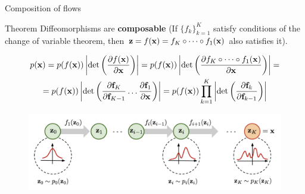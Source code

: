 \begin{frame}{Composition of flows}
	\begin{block}{Theorem}
		Diffeomorphisms are \textbf{composable} (If $\{f_k\}_{k=1}^K$ satisfy conditions of the change of variable theorem, then $\mathbf{z} = f(\mathbf{x}) = f_K \circ \dots \circ f_1(\mathbf{x})$ also satisfies it).
	\end{block}
	\vspace{-0.5cm}
	{ \footnotesize
	\begin{multline*}
		p(\mathbf{x}) = p(f(\mathbf{x})) \left|\det \left(  \frac{\partial f(\mathbf{x})}{\partial \mathbf{x}} \right) \right| = p(f(\mathbf{x})) \left|\det \left(\frac{\partial f_K \circ \dots \circ f_1(\mathbf{x})}{\partial \mathbf{x}} \right) \right| = \\ =
		p(f(\mathbf{x})) \left|\det \left(\frac{\partial \textbf{f}_K}{\partial \textbf{f}_{K-1}} \dots \frac{\partial \textbf{f}_1}{\partial \mathbf{x}} \right) \right| = p(f(\mathbf{x})) \prod_{k=1}^K \left|\det \left(\frac{\partial \textbf{f}_{k}}{\partial \textbf{f}_{k-1}} \right) \right|
	\end{multline*}
	}
	\vspace{-0.3cm}
	\begin{figure}
		\includegraphics[width=\linewidth]{figs/normalizing-flow}
	\end{figure}
\end{frame}

